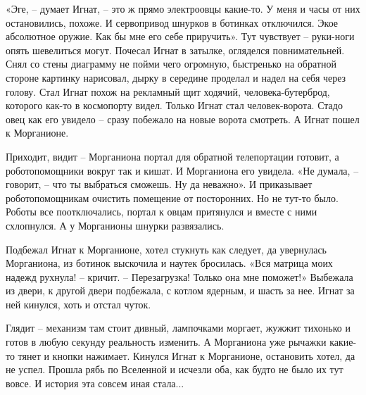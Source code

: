 \documentclass[ebook,oneside,final,openright]{memoir}
\begin{document}
«Эге, – думает Игнат, – это ж прямо электроовцы какие-то. У меня и часы от них остановились, похоже. И сервопривод шнурков в ботинках отключился. Экое абсолютное оружие. Как бы мне его себе приручить». Тут чувствует – руки-ноги опять шевелиться могут. Почесал Игнат в затылке, огляделся повнимательней. Снял со стены диаграмму не пойми чего огромную, быстренько на обратной стороне картинку нарисовал, дырку в середине проделал и надел на себя через голову. Стал Игнат похож на рекламный щит ходячий, человека-бутерброд, которого как-то в космопорту видел. Только Игнат стал человек-ворота. Стадо овец как его увидело – сразу побежало на новые ворота смотреть. А Игнат пошел к Морганионе.\par
\par
Приходит, видит – Морганиона портал для обратной телепортации готовит, а роботопомощники вокруг так и кишат. И Морганиона его увидела. «Не думала, – говорит, – что ты выбраться сможешь. Ну да неважно». И приказывает роботопомощникам очистить помещение от посторонних. Но не тут-то было. Роботы все поотключались, портал к овцам притянулся и вместе с ними схлопнулся. А у Морганионы шнурки развязались.\par
\par
Подбежал Игнат к Морганионе, хотел стукнуть как следует, да увернулась Морганиона, из ботинок выскочила и наутек бросилась. «Вся матрица моих надежд рухнула! – кричит. – Перезагрузка! Только она мне поможет!» Выбежала из двери, к другой двери подбежала, с котлом ядерным, и шасть за нее. Игнат за ней кинулся, хоть и отстал чуток.\par
\par
Глядит – механизм там стоит дивный, лампочками моргает, жужжит тихонько и готов в любую секунду реальность изменить. А Морганиона уже рычажки какие-то тянет и кнопки нажимает. Кинулся Игнат к Морганионе, остановить хотел, да не успел. Прошла рябь по Вселенной и исчезли оба, как будто не было их тут вовсе. И история эта совсем иная стала...\par
\end{document}
